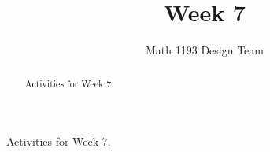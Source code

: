 \documentclass[noauthor]{ximera}
\title{Week 7}
\author{Math 1193 Design Team}
\begin{document}
\begin{abstract}
    Activities for Week 7.
\end{abstract}
\maketitle

Activities for Week 7.
\end{document}

